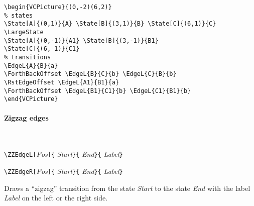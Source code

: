 \documentclass[11pt,twoside]{article}
\newlength{\ColoText}%
\newlength{\ColoFigu}%
\newlength{\parindenttemp} %
\newcommand{\noi}{\noindent}
\newlength{\jsIndent}%
\newlength{\ColSource}%
\newlength{\ColFigur}%
\begin{document}
\medskip
\noi 
\hspace*{-\jsIndent}
\begin{minipage}[c]{\ColFigur}%
\par\vspace*{0mm}%
\bigskip 
\begin{center}
%
\end{center}
\end{minipage}%
\hspace*{1.2em}%
\begin{minipage}[c]{\ColSource}
\setlength{\parindent}{\parindenttemp}%
\par\vspace*{0mm}%
\footnotesize
\begin{verbatim}
\begin{VCPicture}{(0,-2)(6,2)}
% states
\State[A]{(0,1)}{A} \State[B]{(3,1)}{B} \State[C]{(6,1)}{C}
\LargeState
\State[A]{(0,-1)}{A1} \State[B]{(3,-1)}{B1}
\State[C]{(6,-1)}{C1}
% transitions 
\EdgeL{A}{B}{a} 
\ForthBackOffset \EdgeL{B}{C}{b} \EdgeL{C}{B}{b} 
\RstEdgeOffset \EdgeL{A1}{B1}{a} 
\ForthBackOffset \EdgeL{B1}{C1}{b} \EdgeL{C1}{B1}{b} 
\end{VCPicture}
\end{verbatim}
\normalsize
\end{minipage}%

\paragraph{Zigzag edges}
~

\noi 
\hspace*{-\jsIndent}
\begin{minipage}[t]{\ColoText}
        \par\vspace*{0mm}%
\medskip 
        \footnotesize
\verb+\ZZEdgeL[+\textsl{Pos}\verb+]{+%
   \textsl{Start}\verb+}{+%
   \textsl{End}\verb+}{+%
   \textsl{Label}\verb+}+
   
\medskip 
\verb+\ZZEdgeR[+\textsl{Pos}\verb+]{+%
   \textsl{Start}\verb+}{+%
   \textsl{End}\verb+}{+%
   \textsl{Label}\verb+}+
   \normalsize
\end{minipage}%
\hspace*{1.2em}%
\begin{minipage}[t]{\ColoFigu}%
\par\vspace*{0mm}%
Draws a ``zigzag'' transition from the state \textsl{Start} to the 
state \textsl{End} with the label \textsl{Label} on the left or
the right side.
\end{minipage}%
\end{document}
